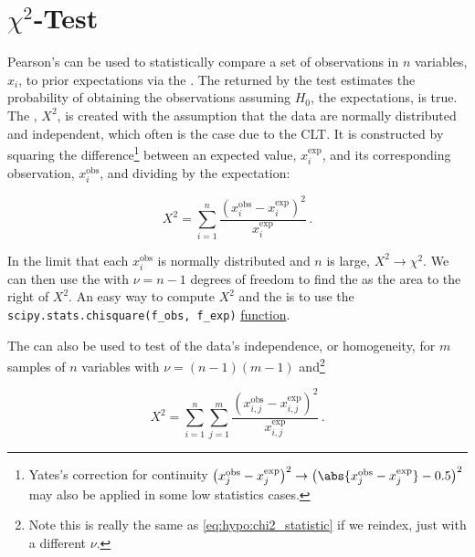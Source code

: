 \section{\texorpdfstring{$\chi^{2}$-Test}{Chi-Squared Test}}
\label{hypo:chi2_test}

Pearson's \chiSqtest can be used to
statistically compare a set of observations in
$n$ variables, $x_{i}$, to prior expectations via the \chiSqdist.
The \pvalue returned by the test estimates the probability of obtaining the observations
assuming $H_{0}$, \ie the expectations, is true.
The \chiSqstat, $X^{2}$, is created with the assumption that
the data are normally distributed and independent,
which often is the case due to the CLT.
It is constructed by squaring the difference\footnote{Yates's
correction for continuity $\left(x^{\text{obs}}_{j} - x^{\text{exp}}_{j}\right)^{2} \to \left(\abs{x^{\text{obs}}_{j} - x^{\text{exp}}_{j}}-0.5\right)^{2}$ may
also be applied in some low statistics cases.} between
an expected value, $x^{\text{exp}}_{i}$, and its corresponding observation, $x^{\text{obs}}_{i}$,
and dividing by the expectation:

\begin{equation}\label{eq:hypo:chi2_statistic}
X^{2} = \sum_{i=1}^{n} \frac{\left(x^{\text{obs}}_{i} - x^{\text{exp}}_{i}\right)^{2}}{x^{\text{exp}}_{i}}\,.
\end{equation}

In the limit that each $x^{\text{obs}}_{i}$ is normally distributed and $n$ is large, $X^{2} \to \chi^{2}$.
We can then use the \chiSqdist with $\nu = n-1$ degrees of freedom to find the \pvalue as the area to the right of $X^{2}$.
An easy way to compute $X^{2}$ and the \pvalue is to use the \texttt{scipy.stats.chisquare(f\_obs, f\_exp)}
\href{https://docs.scipy.org/doc/scipy/reference/generated/scipy.stats.chisquare.html}{function}.

The \chiSqtest can also be used to test of the data's independence, or homogeneity,
for $m$ samples of $n$ variables with $\nu = \left(n-1\right)\left(m-1\right)$ and\footnote{Note this is really the same as \cref{eq:hypo:chi2_statistic} if we reindex, just with a different $\nu$.}

\begin{equation}\label{eq:hypo:chi2_statistic_ind}
X^{2} = \sum_{i=1}^{n} \sum_{j=1}^{m} \frac{\left(x^{\text{obs}}_{i,j} - x^{\text{exp}}_{i,j}\right)^{2}}{x^{\text{exp}}_{i,j}}\,.
\end{equation}

